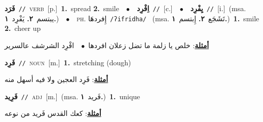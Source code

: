 \documentclass[10pt,a4paper,twoside]{article} %
\begin{document}
\begin{multicols}{2}
{\setlength\topsep{0pt}\textbf{\foreignlanguage{arabic}{فَرَد}}\ {\color{gray}\texttt{//}\color{black}}\ \textsc{verb}\ [p.]\ \textbf{1.}~spread  \textbf{2.}~smile\ \ $\bullet$\ \ \setlength\topsep{0pt}\textbf{\foreignlanguage{arabic}{اِفْرِد}}\ {\color{gray}\texttt{//}\color{black}}\ [c.]\ \ $\bullet$\ \ \setlength\topsep{0pt}\textbf{\foreignlanguage{arabic}{يِفْرِد}}\ {\color{gray}\texttt{//}\color{black}}\ [i.]\ \color{gray}(msa. \foreignlanguage{arabic}{يبتسم}~\foreignlanguage{arabic}{\textbf{٢.}}  \foreignlanguage{arabic}{يَفْرِد}~\foreignlanguage{arabic}{\textbf{١.}})\color{black}\ \ $\bullet$\ \ \textsc{ph.} \color{gray} \foreignlanguage{arabic}{إِفردهَا}\color{black}\ {\color{gray}\texttt{/{\sffamily ʔifridha}/}\color{black}}\ \color{gray} (msa. \foreignlanguage{arabic}{تَشَجَع}~\foreignlanguage{arabic}{\textbf{٢.}}  \foreignlanguage{arabic}{إِبتسم}~\foreignlanguage{arabic}{\textbf{١.}})\color{black}\ \textbf{1.}~smile  \textbf{2.}~cheer up\  \begin{flushright}\color{gray}\foreignlanguage{arabic}{\textbf{\underline{\foreignlanguage{arabic}{أمثلة}}}: خلص يا زلمة ما تضل زعلان افردها\ $\bullet$\ \  افْرِد الشرشف عالسرير}\end{flushright}\color{black}} \vspace{2mm}

{\setlength\topsep{0pt}\textbf{\foreignlanguage{arabic}{فَرِد}}\ {\color{gray}\texttt{//}\color{black}}\ \textsc{noun}\ [m.]\ \textbf{1.}~stretching (dough)\  \begin{flushright}\color{gray}\foreignlanguage{arabic}{\textbf{\underline{\foreignlanguage{arabic}{أمثلة}}}: فَرِد العجين ولا فيه أسهل منه}\end{flushright}\color{black}} \vspace{2mm}

{\setlength\topsep{0pt}\textbf{\foreignlanguage{arabic}{فَرِيد}}\ {\color{gray}\texttt{//}\color{black}}\ \textsc{adj}\ [m.]\ \color{gray}(msa. \foreignlanguage{arabic}{فَريد}~\foreignlanguage{arabic}{\textbf{١.}})\color{black}\ \textbf{1.}~unique\  \begin{flushright}\color{gray}\foreignlanguage{arabic}{\textbf{\underline{\foreignlanguage{arabic}{أمثلة}}}: كعك القدس فَريد من نوعه}\end{flushright}\color{black}} \vspace{2mm}


\end{multicols}
\end{document}
